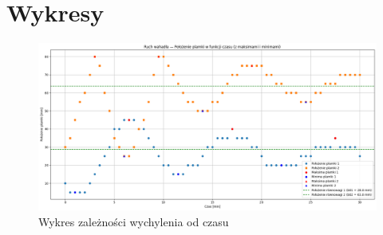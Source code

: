 \documentclass[a4paper,12pt]{article}
\begin{document}
\section{Wykresy}

\begin{figure}[H]
    \centering
    \includegraphics[width=0.9\textheight,angle=90]{wykres.png}
    \caption{Wykres zależności wychylenia od czasu}
    \label{fig:wykres}
\end{figure}




\end{document}

